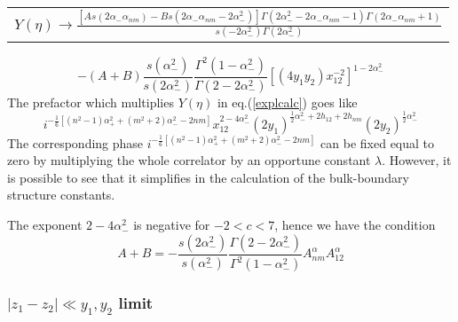 \documentclass[a4paper,12pt]{report}
\begin{document}
\begin{tabular}{c}
$Y\left(\eta  \right)\rightarrow \frac{\left[As\left(2\alpha _{-}\alpha _{nm} \right)-Bs\left(2\alpha _{-}\alpha
_{nm} -2\alpha _{-}^{2}\right)\right]\Gamma\left(2\alpha _{-}^{2}-2\alpha _{-}\alpha _{nm}-1\right) \Gamma
\left(2\alpha _{-}\alpha _{nm}+1\right)}{s\left(-2\alpha _{-}^{2}\right)\Gamma \left(2\alpha _{-}^{2}\right)}$
\end{tabular}
\begin{equation}
 -(A+B)\frac{s\left(\alpha _{-}^{2}\right)}{s\left(2\alpha _{-}^{2}\right)}\frac{\Gamma^{2} \left(1-\alpha
_{-}^{2}\right)}{\Gamma\left(2-2\alpha _{-}^{2}\right) }\left[\left(4y_{1}y_{2} \right)x_{12}^{-2}
\right]^{1-2\alpha _{-}^{2}}
\end{equation}
The prefactor which multiplies $Y(\eta)$ in eq.(\ref{explcalc}) goes like
\begin{equation}\label{prefactor}
i^{-\frac{1}{6}\left[\left(n^{2}-1 \right)\alpha _{+}^{2}+\left(m^{2}+2 \right)\alpha _{-}^{2}-2nm
\right]}x_{12}^{2-4\alpha _{-}^{2}}\left(2y_{1} \right)^{\frac{1}{2}\alpha_{-}^{2}+2h_{12}+2h_{nm} }\left(2y_{2}
\right)^{\frac{1}{2}\alpha_{-}^{2} }
\end{equation}
The corresponding phase $ i^{-\frac{1}{6}\left[\left(n^{2}-1 \right)\alpha _{+}^{2}+\left(m^{2}+2 \right)\alpha
_{-}^{2}-2nm \right]}$ can be fixed equal to zero by multiplying the whole correlator by an opportune constant $
\lambda $. However, it is possible to see that it simplifies in the calculation of the bulk-boundary structure
constants.

The exponent $ 2-4\alpha _{-}^{2}$ is negative for $ -2< c< 7$, hence we have the condition
\begin{equation}\label{A+B}
A+B=-\frac{s\left(2\alpha _{-}^{2} \right)}{s\left(\alpha _{-}^{2} \right)}\frac{\Gamma \left(2-2\alpha _{-}^{2}
\right)}{\Gamma ^{2}\left(1-\alpha _{-}^{2} \right)}A_{nm}^{\alpha}A_{12}^{\alpha}
\end{equation}


\subsubsection{$ \mid z_{1}-z_{2}\mid \ll y_{1},y_{2}$  limit}

\vspace{3cm}
\end{document}
